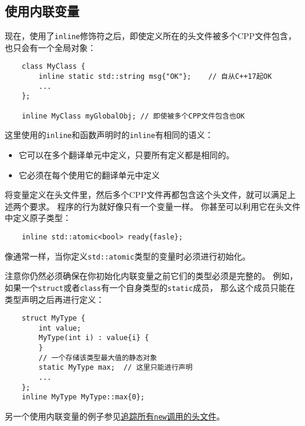 \subsection{使用内联变量}
现在，使用了\texttt{inline}修饰符之后，即使定义所在的头文件被多个CPP文件包含，
也只会有一个全局对象：
\begin{lstlisting}
    class MyClass {
        inline static std::string msg{"OK"};    // 自从C++17起OK
        ...
    };

    inline MyClass myGlobalObj; // 即使被多个CPP文件包含也OK
\end{lstlisting}
这里使用的\texttt{inline}和函数声明时的\texttt{inline}有相同的语义：
\begin{itemize}[leftmargin=*]
    \item 它可以在多个翻译单元中定义，只要所有定义都是相同的。
    \item 它必须在每个使用它的翻译单元中定义
\end{itemize}
将变量定义在头文件里，然后多个CPP文件再都包含这个头文件，就可以满足上述两个要求。
程序的行为就好像只有一个变量一样。
你甚至可以利用它在头文件中定义原子类型：
\begin{lstlisting}
    inline std::atomic<bool> ready{fasle};
\end{lstlisting}
像通常一样，当你定义\texttt{std::atomic}类型的变量时必须进行初始化。

注意你仍然必须确保在你初始化内联变量之前它们的类型必须是完整的。
例如，如果一个\texttt{struct}或者\texttt{class}有一个自身类型的\texttt{static}成员，
那么这个成员只能在类型声明之后再进行定义：
\begin{lstlisting}
    struct MyType {
        int value;
        MyType(int i) : value{i} {
        }
        // 一个存储该类型最大值的静态对象
        static MyType max;  // 这里只能进行声明
        ...
    };
    inline MyType MyType::max{0};
\end{lstlisting}
另一个使用内联变量的例子参见\hyperref[ch30.4]{追踪所有\texttt{new}调用的头文件}。

